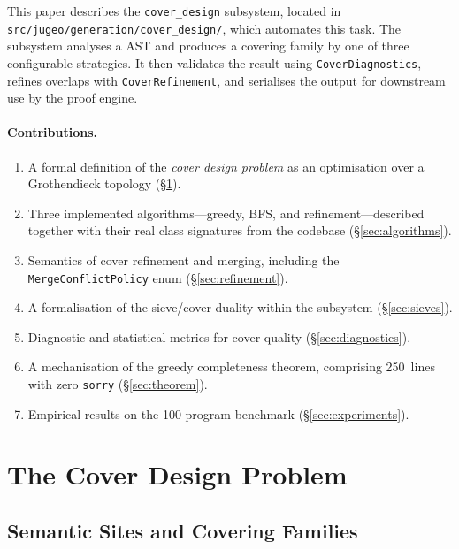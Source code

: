 \documentclass[11pt]{article}
\begin{document}
This paper describes the \texttt{cover\_design} subsystem, located in
\texttt{src/jugeo/generation/cover\_design/}, which automates this
task.
The subsystem analyses a \Python{} AST and produces a covering family
by one of three configurable strategies.
It then validates the result using \texttt{CoverDiagnostics}, refines
overlaps with \texttt{CoverRefinement}, and serialises the output for
downstream use by the proof engine.

\paragraph{Contributions.}
\begin{enumerate}
  \item A formal definition of the \emph{cover design problem} as an
        optimisation over a Grothendieck topology (\S\ref{sec:problem}).
  \item Three implemented algorithms---greedy, BFS, and
        refinement---described together with their real class signatures
        from the \JuGeo{} codebase (\S\ref{sec:algorithms}).
  \item Semantics of cover refinement and merging, including the
        \texttt{MergeConflictPolicy} enum (\S\ref{sec:refinement}).
  \item A formalisation of the sieve/cover duality within the
        subsystem (\S\ref{sec:sieves}).
  \item Diagnostic and statistical metrics for cover quality
        (\S\ref{sec:diagnostics}).
  \item A \LEAN{} mechanisation of the greedy completeness theorem,
        comprising 250~lines with zero \texttt{sorry}
        (\S\ref{sec:theorem}).
  \item Empirical results on the 100-program benchmark
        (\S\ref{sec:experiments}).
\end{enumerate}

\section{The Cover Design Problem}\label{sec:problem}

\subsection{Semantic Sites and Covering Families}
\end{document}
